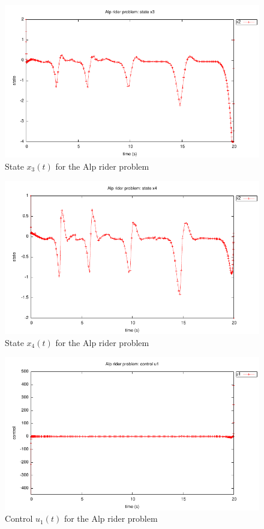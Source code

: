 \documentclass[a4paper,11pt]{report}    %
\begin{document}
\begin{figure}
  \centering
  \includegraphics{../examples/alpine/alpine_state3}
  \caption{State $x_3(t)$ for the Alp rider problem}
  \label{alpine_state3}
\end{figure}

\begin{figure}
  \centering
  \includegraphics{../examples/alpine/alpine_state4}
  \caption{State $x_4(t)$ for the Alp rider problem}
  \label{alpine_state4}
\end{figure}


\begin{figure}
  \centering
  \includegraphics{../examples/alpine/alpine_control1}
  \caption{Control $u_1(t)$ for the Alp rider  problem}
  \label{alpine_control1}
\end{figure}
\end{document}

